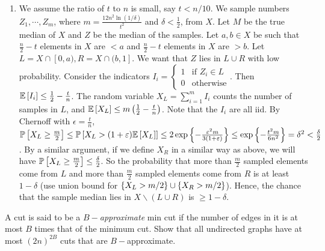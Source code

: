 \begin{enumerate}[leftmargin = *, label=(\alph*)]
\item We assume the ratio of $t$ to $n$ is small, say $t < n/10$. We sample numbers $Z_{1},\cdots,Z_{m}$, where $m=\frac{12n^{2}\ln(1/\delta)}{t^{2}}$ and $\delta<\frac12$, from $X$. Let $M$ be the true median of $X$ and $Z$ be the median of the samples. Let $a,b\in X$ be such that $\frac{n}{2}-t$ elements in $X$ are $< a$ and $\frac{n}{2}-t$ elements in $X$ are $>b$. Let $L = X\cap[0,a), R=X\cap(b,1]$. We want that $Z$ lies in $L\cup R$ with low probability.
Consider the indicators $I_{i} = \begin{cases}1&\text{if } Z_{i}\in L\\0&\text{otherwise}\end{cases}$. Then $\E{I_{i}} \le \frac{1}{2} - \frac{t}{n}$. The random variable $X_{L} = \sum\limits_{i=1}^{m} I_{i}$ counts the number of samples in $L$, and $\E {X_{L}} \le m\left(\frac{1}{2} - \frac{t}{n}\right)$. Note that the $I_{i}$ are all iid. By Chernoff with $\epsilon=\frac tn$, $\P{X_{L} \ge \frac{m}2} \le \P{X_{L} > (1+\epsilon)\E{X_{L}}} \le 2\exp\set{-\frac{\epsilon^{2}m}{3(1+\epsilon)}} \le \exp\set{-\frac{t^{2}m}{6n^{2}}} = \delta^{2} < \frac{\delta}{2}$. 
By a similar argument, if we define $X_{R}$ in a similar way as above, we will have $\P{X_{L}\ge\frac{m}{2}} \le \frac{\delta}2$. So the probability that more than $\frac{m}{2}$ sampled elements come from $L$ and more than $\frac{m}{2}$ sampled elements come from $R$ is at least $1-\delta$ (use union bound for $\set{X_{L}>m/2}\cup\set{X_{R}>m/2}$). Hence, the chance that the sample median lies in $X\smallsetminus(L\cup R)$ is $\ge 1-\delta$.
\end{enumerate}
























\newpage
\pb
A cut is said to be a $B-$\textit{approximate} min cut if the number of edges in it is at most $B$ times that of the minimum cut. Show that all undirected graphs have at most $(2n)^{2B}$ cuts that are $B-$approximate.

\soln

